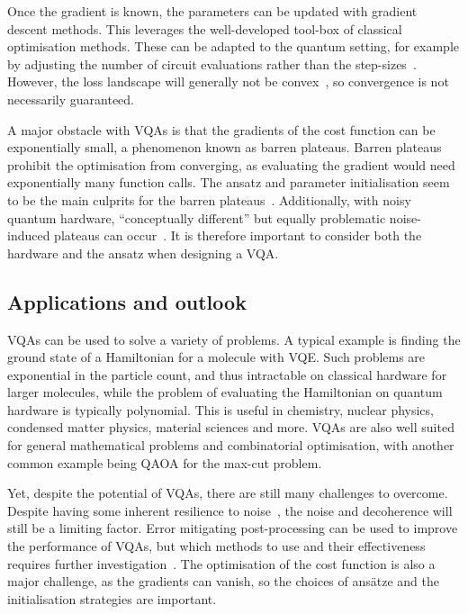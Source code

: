 Once the gradient is known, the parameters can be updated with gradient descent methods.
This leverages the well-developed tool-box of classical optimisation methods.
These can be adapted to the quantum setting, for example by adjusting the number of circuit evaluations rather than the step-sizes~\autocite{sweke2020}.
However, the loss landscape will generally not be convex~\autocite{huembeli2021}, so convergence is not necessarily guaranteed.

A major obstacle with VQAs is that the gradients of the cost function can be exponentially small, a phenomenon known as barren plateaus.
Barren plateaus prohibit the optimisation from converging, as evaluating the gradient would need exponentially many function calls.
The ansatz and parameter initialisation seem to be the main culprits for the barren plateaus~\autocite{mcclean2018, cerezo2021a}.
Additionally, with noisy quantum hardware, \enquote{conceptually different} but equally problematic noise-induced plateaus can occur~\autocite{wang2021}.
It is therefore important to consider both the hardware and the ansatz when designing a VQA.

\subsection{Applications and outlook}
VQAs can be used to solve a variety of problems.
A typical example is finding the ground state of a Hamiltonian for a molecule with VQE.
Such problems are exponential in the particle count, and thus intractable on classical hardware for larger molecules, while the problem of evaluating the Hamiltonian on quantum hardware is typically polynomial.
This is useful in chemistry, nuclear physics, condensed matter physics, material sciences and more.
VQAs are also well suited for general mathematical problems and combinatorial optimisation, with another common example being QAOA for the max-cut problem.

Yet, despite the potential of VQAs, there are still many challenges to overcome.
Despite having some inherent resilience to noise~\autocite{cerezo2021}, the noise and decoherence will still be a limiting factor.
Error mitigating post-processing can be used to improve the performance of VQAs, but which methods to use and their effectiveness requires further investigation~\autocite{endo2021}.
The optimisation of the cost function is also a major challenge, as the gradients can vanish, so the choices of ansätze and the initialisation strategies are important.

